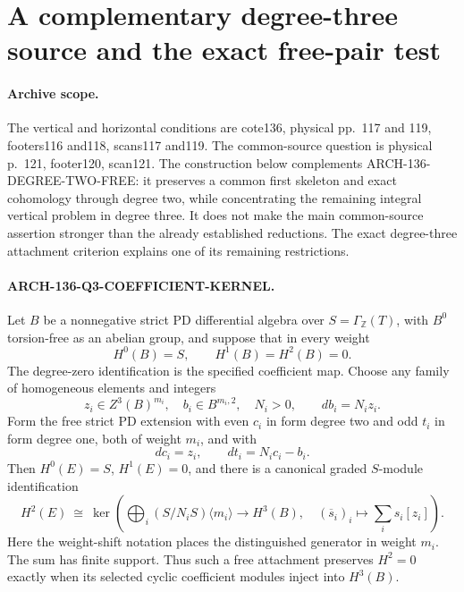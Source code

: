 \section{A complementary degree-three source and the exact free-pair test}
\label{sec:136-degree-three-common-skeleton}

\paragraph{Archive scope.}
The vertical and horizontal conditions are cote136, physical
pp.~117 and 119, footers116 and118, scans117 and119. The
common-source question is physical p.~121, footer120, scan121.
The construction below complements ARCH-136-DEGREE-TWO-FREE:
it preserves a common first skeleton and exact cohomology
through degree two, while concentrating the remaining integral
vertical problem in degree three. It does not make the main
common-source assertion stronger than the already established
reductions. The exact degree-three attachment criterion explains
one of its remaining restrictions.

\paragraph{ARCH-136-Q3-COEFFICIENT-KERNEL.}
Let \(B\) be a nonnegative strict PD differential algebra over
\(S=\Gamma_{\mathbb Z}(T)\), with \(B^0\) torsion-free as
an abelian group, and suppose that in every weight
\[
             H^0(B)=S,\qquad H^1(B)=H^2(B)=0.             \tag{136.QK1}
\]
The degree-zero identification is the specified coefficient map.
Choose any family of homogeneous elements and integers
\[
 z_i\in Z^3(B)^{m_i},\quad b_i\in B^{m_i,2},\quad
 N_i>0,\qquad db_i=N_i z_i.
\]
Form the free strict PD extension with even \(c_i\) in form
degree two and odd \(t_i\) in form degree one, both of weight
\(m_i\), and with
\[
                  dc_i=z_i,\qquad dt_i=N_i c_i-b_i.
                                                               \tag{136.QK2}
\]
Then \(H^0(E)=S\), \(H^1(E)=0\), and there is a canonical
graded \(S\)-module identification
\[
 H^2(E)\ \cong\
 \ker\left(\bigoplus_i(S/N_iS)\langle m_i\rangle
                \longrightarrow H^3(B),\quad
                (\overline s_i)_i\longmapsto
                            \sum_i s_i[z_i]\right).
                                                               \tag{136.QK3}
\]
Here the weight-shift notation places the distinguished generator
in weight \(m_i\). The sum has finite support. Thus such a
free attachment preserves \(H^2=0\) exactly when its selected
cyclic coefficient modules inject into \(H^3(B)\).

